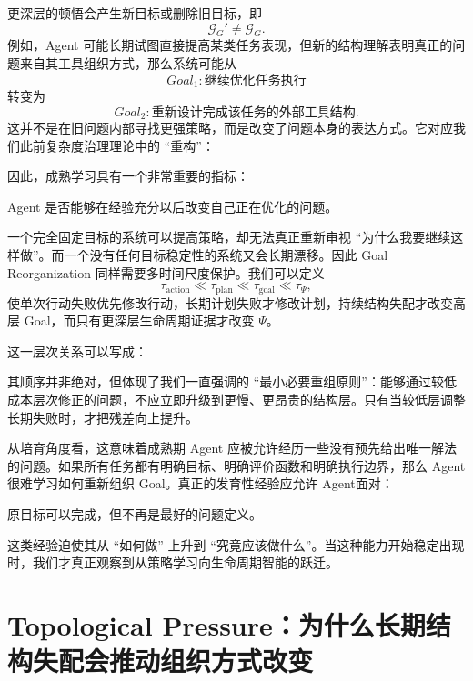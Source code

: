 更深层的顿悟会产生新目标或删除旧目标，即
\[
\mathcal G_G'
\neq
\mathcal G_G.
\]
例如，Agent 可能长期试图直接提高某类任务表现，但新的结构理解表明真正的问题来自其工具组织方式，那么系统可能从
\[
Goal_1:
\text{继续优化任务执行}
\]
转变为
\[
Goal_2:
\text{重新设计完成该任务的外部工具结构}.
\]
这并不是在旧问题内部寻找更强策略，而是改变了问题本身的表达方式。它对应我们此前复杂度治理理论中的 ``重构''：
\begin{statementbox}
\centering
{}
\end{statementbox}

因此，成熟学习具有一个非常重要的指标：
\begin{statementbox}
Agent 是否能够在经验充分以后改变自己正在优化的问题。
\end{statementbox}
一个完全固定目标的系统可以提高策略，却无法真正重新审视 ``为什么我要继续这样做''。而一个没有任何目标稳定性的系统又会长期漂移。因此 Goal Reorganization 同样需要多时间尺度保护。我们可以定义
\[
\tau_{\mathrm{action}}
\ll
\tau_{\mathrm{plan}}
\ll
\tau_{\mathrm{goal}}
\ll
\tau_{\Psi},
\]
使单次行动失败优先修改行动，长期计划失败才修改计划，持续结构失配才改变高层 Goal，而只有更深层生命周期证据才改变 $\Psi$。

这一层次关系可以写成：
\begin{statementbox}
\centering
{}
\end{statementbox}
其顺序并非绝对，但体现了我们一直强调的 ``最小必要重组原则''：能够通过较低成本层次修正的问题，不应立即升级到更慢、更昂贵的结构层。只有当较低层调整长期失败时，才把残差向上提升。

从培育角度看，这意味着成熟期 Agent 应被允许经历一些没有预先给出唯一解法的问题。如果所有任务都有明确目标、明确评价函数和明确执行边界，那么 Agent 很难学习如何重新组织 Goal。真正的发育性经验应允许 Agent面对：
\begin{remark}
原目标可以完成，但不再是最好的问题定义。
\end{remark}
这类经验迫使其从 ``如何做'' 上升到 ``究竟应该做什么''。当这种能力开始稳定出现时，我们才真正观察到从策略学习向生命周期智能的跃迁。

\section{Topological Pressure：为什么长期结构失配会推动组织方式改变}

